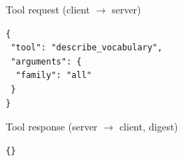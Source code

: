\begin{mcpbox}{Tool request (client $\rightarrow$ server)}
\begin{lstlisting}[style=jsonstyle]
{
 "tool": "describe_vocabulary",
 "arguments": {
  "family": "all"
 }
}
\end{lstlisting}
\end{mcpbox}
\begin{mcpbox}{Tool response (server $\rightarrow$ client, digest)}
\begin{lstlisting}[style=jsonstyle]
{}
\end{lstlisting}
\end{mcpbox}